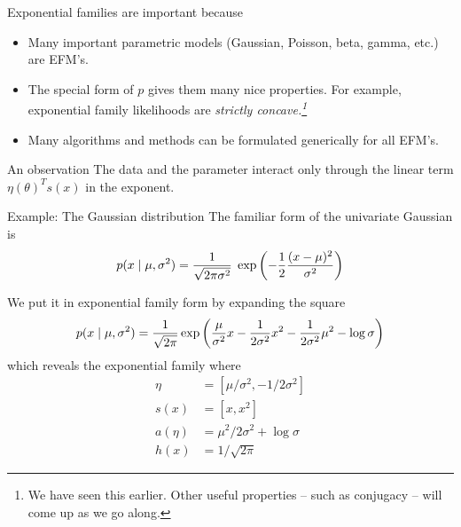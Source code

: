 \documentclass[10pt]{beamer}
\begin{document}
\begin{frame}
\begin{sblock}{Exponential families are important because}
\begin{itemize}
\item Many important parametric models (Gaussian, Poisson, beta, gamma, etc.) are EFM's.
\item The special form of $p$ gives them many nice properties. For example, exponential family likelihoods are \it{strictly concave.}\footnote{We have seen this earlier. Other useful properties -- such as conjugacy -- will come up as we go along.}
\item Many algorithms and methods can be formulated generically for all EFM's. 
\end{itemize}
\end{sblock}
\vfill
\begin{sblock}{An observation}
The data and the parameter interact only through the linear term $\eta(\theta)^T s(x)$ in the exponent.
\end{sblock}

%
%
\end{frame}




\begin{frame}{Example: The Gaussian distribution}
\footnotesize
The familiar form of the univariate Gaussian is 
\[ p(x \; | \; \mu, \sigma^2) = \displaystyle\frac{1}{\sqrt{2 \pi \sigma^2}} \; \exp \bigg( { - \displaystyle\frac{1}{2} \displaystyle\frac{(x-\mu)^2}{\sigma^2}} \bigg)  \] 
\pause

We put it in exponential family form by expanding the square
\begin{align*}
 p(x \; | \; \mu, \sigma^2) = \displaystyle\frac{1}{\sqrt{2 \pi}} \exp \bigg( { \displaystyle\frac{\mu}{\sigma^2} x - \displaystyle\frac{1}{2 \sigma^2} x^2 - \displaystyle\frac{1}{2 \sigma^2} \mu^2 - \log \sigma} \bigg)
 \end{align*}
 which reveals the exponential family where
 \begin{align*}
\eta &= [\mu/\sigma^2, -1/2 \sigma^2 ]\\
s(x) &= [x, x^2] \\
a(\eta) &= \mu^2/2\sigma^2 + \log \sigma \\
h(x) &=  1/\sqrt{2 \pi}
 \end{align*}

\end{frame}
\end{document}
